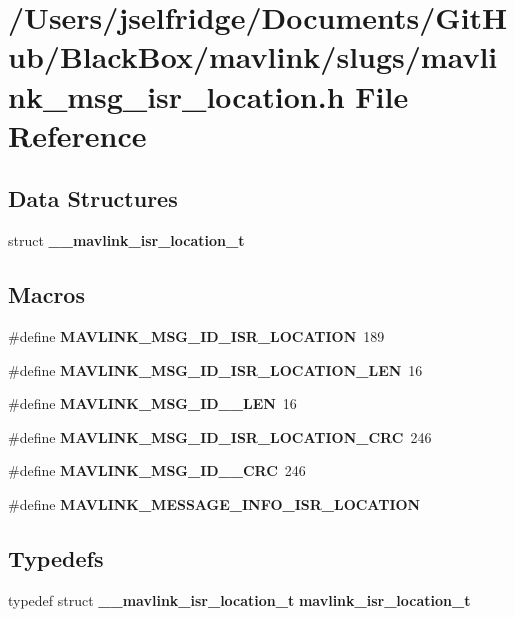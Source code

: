 \section{/\+Users/jselfridge/\+Documents/\+Git\+Hub/\+Black\+Box/mavlink/slugs/mavlink\+\_\+msg\+\_\+isr\+\_\+location.h File Reference}
\label{mavlink__msg__isr__location_8h}
\subsection*{Data Structures}
\begin{DoxyCompactItemize}
\item 
struct \textbf{ \+\_\+\+\_\+mavlink\+\_\+isr\+\_\+location\+\_\+t}
\end{DoxyCompactItemize}
\subsection*{Macros}
\begin{DoxyCompactItemize}
\item 
\#define \textbf{ M\+A\+V\+L\+I\+N\+K\+\_\+\+M\+S\+G\+\_\+\+I\+D\+\_\+\+I\+S\+R\+\_\+\+L\+O\+C\+A\+T\+I\+ON}~189
\item 
\#define \textbf{ M\+A\+V\+L\+I\+N\+K\+\_\+\+M\+S\+G\+\_\+\+I\+D\+\_\+\+I\+S\+R\+\_\+\+L\+O\+C\+A\+T\+I\+O\+N\+\_\+\+L\+EN}~16
\item 
\#define \textbf{ M\+A\+V\+L\+I\+N\+K\+\_\+\+M\+S\+G\+\_\+\+I\+D\+\_\+\_\+\+L\+EN}~16
\item 
\#define \textbf{ M\+A\+V\+L\+I\+N\+K\+\_\+\+M\+S\+G\+\_\+\+I\+D\+\_\+\+I\+S\+R\+\_\+\+L\+O\+C\+A\+T\+I\+O\+N\+\_\+\+C\+RC}~246
\item 
\#define \textbf{ M\+A\+V\+L\+I\+N\+K\+\_\+\+M\+S\+G\+\_\+\+I\+D\+\_\+\_\+\+C\+RC}~246
\item 
\#define \textbf{ M\+A\+V\+L\+I\+N\+K\+\_\+\+M\+E\+S\+S\+A\+G\+E\+\_\+\+I\+N\+F\+O\+\_\+\+I\+S\+R\+\_\+\+L\+O\+C\+A\+T\+I\+ON}
\end{DoxyCompactItemize}
\subsection*{Typedefs}
\begin{DoxyCompactItemize}
\item 
typedef struct \textbf{ \+\_\+\+\_\+mavlink\+\_\+isr\+\_\+location\+\_\+t} \textbf{ mavlink\+\_\+isr\+\_\+location\+\_\+t}
\end{DoxyCompactItemize}



